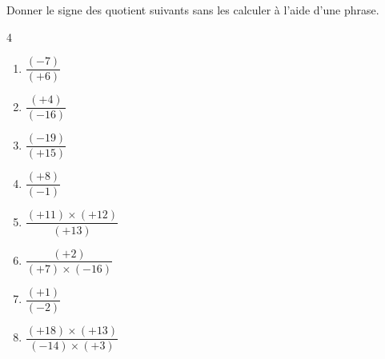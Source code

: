 \begin{exercice*}
    Donner le signe des quotient suivants sans les calculer à l'aide d'une phrase.
    \begin{multicols}4
      \begin{spacing}{2}
        \begin{enumerate}
            \item $ \dfrac{(-7)}{(+6)} $            
            \item $ \dfrac{(+4)}{(-16)} $            
            \item $ \dfrac{(-19)}{(+15)} $
            \item $ \dfrac{(+8)}{(-1)} $     
            \item $ \dfrac{(+11) \times (+12)}{(+13)} $
	    	    \item $ \dfrac{(+2)}{(+7) \times (-16)} $
	    	    \item $ \dfrac{(+1)}{(-2)} $
	    	    \item $ \dfrac{(+18) \times (+13)}{(-14) \times (+3)} $	
        \end{enumerate}
      \end{spacing}
    \end{multicols}
\end{exercice*}
